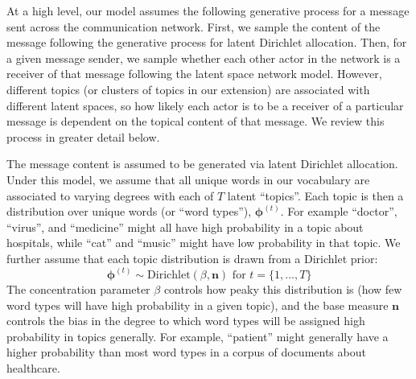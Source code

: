 \documentclass{pnastwo}
\begin{document}
\begin{article}
At a high level, our model assumes the following generative process for a message sent across the communication network. First, we sample the content of the message following the generative process for latent Dirichlet allocation. Then, for a given message sender, we sample whether each other actor in the network is a receiver of that message following the latent space network model. However, different topics (or clusters of topics in our extension) are associated with different latent spaces, so how likely each actor is to be a receiver of a particular message is dependent on the topical content of that message. We review this process in greater detail below.  


The message content is assumed to be generated via latent Dirichlet allocation. Under this model, we assume that all unique words in our vocabulary are associated to varying degrees with each of $T$ latent ``topics''. Each topic is then a distribution over unique words (or ``word types''), $\boldsymbol{\phi}^{(t)}$. For example ``doctor'', ``virus'', and ``medicine'' might all have high probability in a topic about hospitals, while ``cat'' and ``music'' might have low probability in that topic. We further assume that each topic distribution is drawn from a Dirichlet prior: 
\begin{equation}
	\boldsymbol{\phi}^{(t)} \sim \text{Dirichlet}(\beta,\boldsymbol{n}) \text{ for } t = \{1, ..., T\}
\end{equation}
The concentration parameter $\beta$ controls how peaky this distribution is (how few word types will have high probability in a given topic), and the base measure $\boldsymbol{n}$ controls the bias in the degree to which word types will be assigned high probability in topics generally. For example, ``patient'' might generally have a higher probability than most word types in a corpus of documents about healthcare.   


\end{article}
\end{document}
